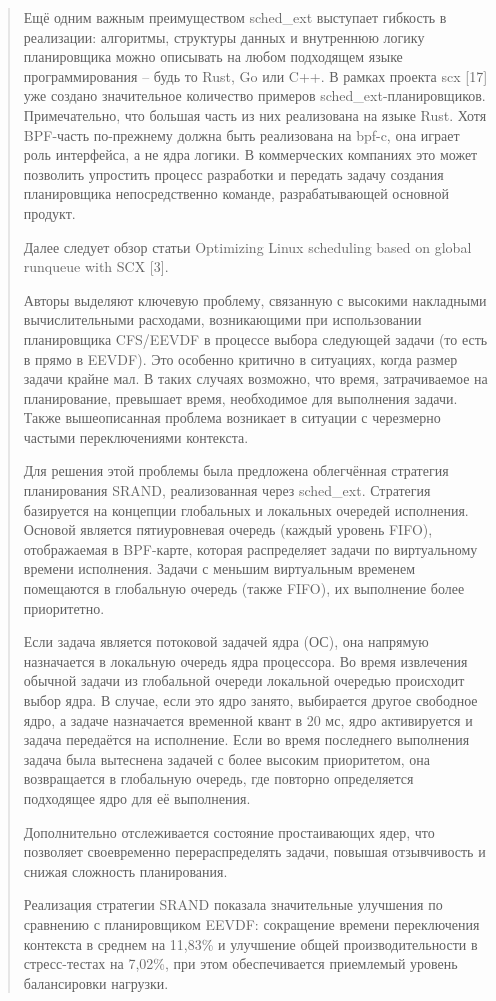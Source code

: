 \documentclass[12pt, oneside]{book}
\begin{document}
\begin{quote}
  Ещё одним важным преимуществом sched\_ext выступает гибкость
  в реализации: алгоритмы, структуры данных и внутреннюю логику планировщика
  можно описывать на любом подходящем языке программирования -- будь то Rust,
  Go или C++. В рамках проекта scx [17] уже создано значительное количество
  примеров sched\_ext-планировщиков. Примечательно, что большая часть из них
  реализована на языке Rust.
  Хотя BPF-часть по-прежнему должна быть реализована на
  bpf-c, она играет роль интерфейса, а не ядра логики. В коммерческих компаниях
  это может позволить упростить процесс разработки и передать задачу
  создания планировщика непосредственно команде, разрабатывающей основной продукт.

  Далее следует обзор статьи Optimizing Linux scheduling based on
  global\\ runqueue with SCX [3].

  Авторы выделяют ключевую проблему, связанную с высокими накладными
  вычислительными расходами, возникающими при использовании планировщика
  CFS/EEVDF в процессе выбора следующей задачи (то есть в прямо в EEVDF).
  Это особенно критично в ситуациях, когда размер задачи крайне мал.
  В таких случаях возможно, что время, затрачиваемое на планирование,
  превышает время, необходимое для выполнения задачи. Также вышеописанная
  проблема возникает в ситуации с черезмерно частыми переключениями контекста.

  Для решения этой проблемы была предложена облегчённая стратегия планирования
  SRAND, реализованная через sched\_ext.
  Стратегия базируется на концепции глобальных и локальных очередей исполнения.
  Основой является пятиуровневая очередь (каждый уровень FIFO),
  отображаемая в BPF-карте, которая распределяет задачи по виртуальному
  времени исполнения.
  Задачи с меньшим виртуальным временем помещаются
  в глобальную очередь (также FIFO), их выполнение более приоритетно.

  Если задача является потоковой задачей ядра (ОС), она напрямую назначается
  в локальную очередь ядра процессора.
  Во время извлечения обычной задачи из глобальной очереди локальной очередью
  происходит выбор ядра. В случае, если это ядро занято, выбирается
  другое свободное ядро, а задаче назначается временной квант в 20 мс,
  ядро активируется и задача передаётся на исполнение. Если во время последнего выполнения
  задача была вытеснена задачей с более высоким приоритетом, она возвращается
  в глобальную очередь, где повторно определяется подходящее ядро для её выполнения.

  Дополнительно отслеживается состояние простаивающих ядер, что позволяет
  своевременно перераспределять задачи, повышая отзывчивость и снижая
  сложность планирования.

  Реализация стратегии SRAND показала значительные улучшения по сравнению
  с планировщиком EEVDF: сокращение времени переключения контекста в среднем
  на 11,83\% и улучшение общей производительности в стресс-тестах на 7,02\%,
  при этом обеспечивается приемлемый уровень балансировки нагрузки.
\end{quote}
\end{document}
